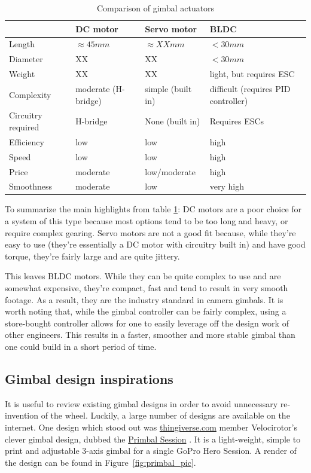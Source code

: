
\begin{table}[h!]
	\centering
	\begin{tabular}{ p{2cm}||p{4cm}|p{4cm}|p{4cm} }
					& DC motor			& Servo motor		& BLDC \\
	\hline \hline
	Length			& $\approx 45mm$	& $\approx XXmm$	& $<30mm$ \\
	\hline
	Diameter		& XX				& XX				& $<30mm$ \\
	\hline
	Weight			& XX				& XX				& light, but requires ESC \\
	\hline
	Complexity		& moderate (H-bridge) & simple (built in) & difficult (requires PID controller) \\
	\hline
	Circuitry required & H-bridge		& None (built in)	& Requires ESCs \\
	\hline
	Efficiency		& low				& low				& high \\
	\hline
	Speed			& low				& low				& high \\
	\hline
	Price			& moderate			& low/moderate		& high \\
	\hline
	Smoothness		& moderate			& low				& very high \\
	\hline
	\end{tabular}
	\caption{Comparison of gimbal actuators}
	\label{table:gimbal_actuators}
\end{table}

To summarize the main highlights from table \ref{table:gimbal_actuators}: DC motors are a poor choice for a system of this type because most options tend to be too long and heavy, or require complex gearing. Servo motors are not a good fit because, while they're easy to use (they're essentially a DC motor with circuitry built in) and have good torque, they're fairly large and are quite jittery.

This leaves BLDC motors. While they can be quite complex to use and are somewhat expensive, they're compact, fast and tend to result in very smooth footage. As a result, they are the industry standard in camera gimbals. It is worth noting that, while the gimbal controller can be fairly complex, using a store-bought controller allows for one to easily leverage off the design work of other engineers. This results in a faster, smoother and more stable gimbal than one could build in a short period of time.

\subsection{Gimbal design inspirations}
It is useful to review existing gimbal designs in order to avoid unnecessary re-invention of the wheel. Luckily, a large number of designs are available on the internet. One design which stood out was \href{https://www.thingiverse.com}{thingiverse.com} member Velocirotor's clever gimbal design, dubbed the \href{https://www.thingiverse.com/thing:2804872}{Primbal Session} \cite{website:primbal_session}. It is a light-weight, simple to print and adjustable 3-axis gimbal for a single GoPro Hero Session. A render of the design can be found in Figure~\ref{fig:primbal_pic}.

